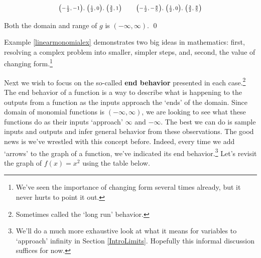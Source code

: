 \documentclass{ximera}
\begin{document}
\begin{ex}
\begin{enumerate}
\[\begin{array}{rcl}
 \text{\scriptsize  $\left(-\frac{1}{2},-1 \right)$, $\left(\frac{1}{2},0 \right)$, $\left(\frac{3}{2},1 \right)$} & & \text{\scriptsize  $\left(-\frac{1}{2},-\frac{8}{5} \right)$, $\left(\frac{1}{2},0 \right)$, $\left(\frac{3}{2},\frac{8}{5} \right)$} \\
 
 \end{array} \]
 
 Both the domain and range of $g$ is $(-\infty, \infty)$. \qed
 
 \end{enumerate} 

 
\end{ex}


Example \ref{linearmonomialex} demonstrates two big ideas in mathematics:  first, resolving a complex problem into smaller, simpler steps, and, second, the value of changing form.\footnote{We've seen the importance of changing form several times already, but it never hurts to point it out.}

Next  we wish  to focus on the so-called  \textbf{end behavior} presented in each case.\footnote{Sometimes called the `long run' behavior.}  The end behavior of a function is a way to describe what is happening to the outputs from a function as the inputs approach the `ends' of the domain. Since domain of monomial functions is $(-\infty, \infty)$, we are looking to see what these functions do as their inputs `approach'  $\infty$ and $-\infty$.  The best we can do is sample inputs and outputs and infer general behavior from these observations.  The good news is we've wrestled with this concept before. Indeed, every time we add `arrows' to the graph of a function, we've indicated its end behavior.\footnote{We'll do a much more exhaustive look at what it means for variables to `approach' infinity in Section \ref{IntroLimits}.  Hopefully this informal discussion suffices for now.} Let's revisit  the graph of $f(x) = x^2$ using the table below.


 \medskip
 
\end{document}
